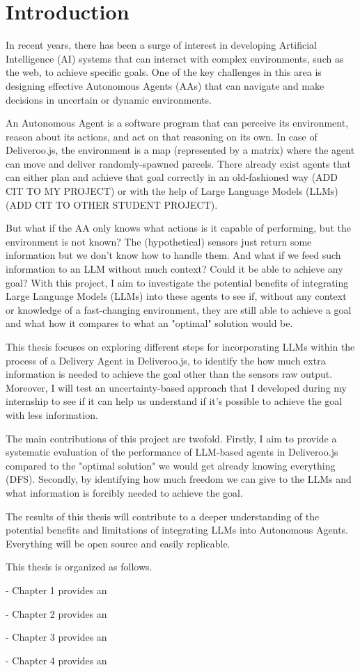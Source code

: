\chapter{Introduction}
\label{cha:examples}

In recent years, there has been a surge of interest in developing Artificial Intelligence
(AI) systems that can interact with complex environments, such as the web, to achieve
specific goals. One of the key challenges in this area is designing effective
Autonomous Agents (AAs) that can navigate and make decisions in uncertain or
dynamic environments.

An Autonomous Agent is a software program that can perceive its environment, reason
about its actions, and act on that reasoning on its own. In case of Deliveroo.js,
the environment is a map (represented by a matrix) where the agent can move and
deliver randomly-spawned parcels. There already exist agents that can either plan
and achieve that goal correctly in an old-fashioned way (ADD CIT TO MY PROJECT) or
with the help of Large Language Models (LLMs) (ADD CIT TO OTHER STUDENT PROJECT).

But what if the AA only knows what actions is it capable of performing, but the
environment is not known? The (hypothetical) sensors just return some information
but we don't know how to handle them. And what if we feed such information to an
LLM without much context? Could it be able to achieve any goal? With this
project, I aim to investigate the potential benefits of integrating Large Language
Models (LLMs) into these agents to see if, without any context or knowledge of a
fast-changing environment, they are still able to achieve a goal and what how it
compares to what an "optimal" solution would be.

This thesis focuses on exploring different steps for incorporating LLMs within the
process of a Delivery Agent in Deliveroo.js, to identify the how much extra
information is needed to achieve the goal other than the sensors raw output. Moreover,
I will test an uncertainty-based approach that I developed during my internship
to see if it can help us understand if it's possible to achieve the goal with
less information.

The main contributions of this project are twofold. Firstly, I aim to provide a
systematic evaluation of the performance of LLM-based agents in Deliveroo.js
compared to the "optimal solution" we would get already knowing everything (DFS).
Secondly, by identifying how much freedom we can give to the LLMs and what
information is forcibly needed to achieve the goal.

The results of this thesis will contribute to a deeper understanding of the
potential benefits and limitations of integrating LLMs into Autonomous Agents. Everything
will be open source and easily replicable.

This thesis is organized as follows.

- Chapter 1 provides an

- Chapter 2 provides an

- Chapter 3 provides an

- Chapter 4 provides an